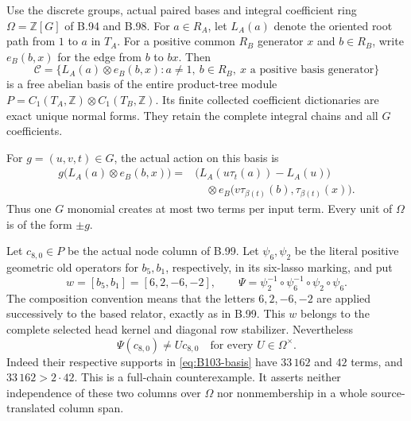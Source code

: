 \label{stmt:B103}
Use the discrete groups, actual paired bases and integral coefficient
ring $\Omega=\mathbb Z[G]$ of B.94 and B.98. For $a\in R_A$, let
$L_A(a)$ denote the oriented root path from $1$ to $a$ in $T_A$.
For a positive common $R_B$ generator $x$ and $b\in R_B$, write
$e_B(b,x)$ for the edge from $b$ to $bx$.
Then
\begin{equation}\label{eq:B103-basis}
 \mathcal C=\{L_A(a)\otimes e_B(b,x):
                   a\ne1,\ b\in R_B,\ x\text{ a positive basis generator}\}
\end{equation}
is a free abelian basis of the entire product-tree module
$P=C_1(T_A,\mathbb Z)\otimes C_1(T_B,\mathbb Z)$.
Its finite collected coefficient dictionaries are exact unique
normal forms. They retain the complete integral chains and all
$G$ coefficients.

For $g=(u,v,t)\in G$, the actual action on this basis is
\begin{equation}\label{eq:B103-action}
 \begin{aligned}
 g\bigl(L_A(a)\otimes e_B(b,x)\bigr)
  ={}&\bigl(L_A(u\tau_t(a))-L_A(u)\bigr)\\
     &\quad\otimes e_B\bigl(v\tau_{\beta(t)}(b),
                                      \tau_{\beta(t)}(x)\bigr).
 \end{aligned}
\end{equation}
Thus one $G$ monomial creates at most two terms per input term.
Every unit of $\Omega$ is of the form $\pm g$.

Let $c_{8,0}\in P$ be the actual node column of B.99. Let
$\psi_6,\psi_2$ be the literal positive geometric old operators
for $b_5,b_1$, respectively, in its six-lasso marking, and put
\[
 w=[b_5,b_1]=[6,2,-6,-2],\qquad
 \Psi=\psi_2^{-1}\circ\psi_6^{-1}\circ\psi_2\circ\psi_6.
\]
The composition convention means that the letters $6,2,-6,-2$
are applied successively to the based relator, exactly as in B.99.
This $w$ belongs to the complete selected head kernel and diagonal
row stabilizer. Nevertheless
\begin{equation}\label{eq:B103-no-unit}
                  \Psi(c_{8,0})\ne U c_{8,0}
                  \quad\text{for every }U\in\Omega^\times.
\end{equation}
Indeed their respective supports in \eqref{eq:B103-basis} have
$33\,162$ and $42$ terms, and $33\,162>2\cdot42$.
This is a full-chain counterexample. It asserts neither independence
of these two columns over $\Omega$ nor nonmembership in a whole
source-translated column span.

